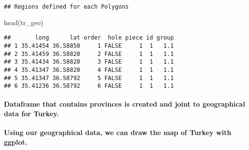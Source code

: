 \documentclass[
]{article}
\newenvironment{Shaded}{\begin{snugshade}}{\end{snugshade}}
\newcommand{\AttributeTok}[1]{\textcolor[rgb]{0.77,0.63,0.00}{#1}}
\newcommand{\CommentTok}[1]{\textcolor[rgb]{0.56,0.35,0.01}{\textit{#1}}}
\newcommand{\FunctionTok}[1]{\textcolor[rgb]{0.00,0.00,0.00}{#1}}
\newcommand{\NormalTok}[1]{#1}
\newcommand{\OtherTok}[1]{\textcolor[rgb]{0.56,0.35,0.01}{#1}}
\newcommand{\SpecialCharTok}[1]{\textcolor[rgb]{0.00,0.00,0.00}{#1}}
\newcommand{\StringTok}[1]{\textcolor[rgb]{0.31,0.60,0.02}{#1}}
\begin{document}
\begin{verbatim}
## Regions defined for each Polygons
\end{verbatim}

\begin{Shaded}
\begin{Highlighting}[]
\FunctionTok{head}\NormalTok{(tr\_geo)}
\end{Highlighting}
\end{Shaded}

\begin{verbatim}
##       long      lat order  hole piece id group
## 1 35.41454 36.58850     1 FALSE     1  1   1.1
## 2 35.41459 36.58820     2 FALSE     1  1   1.1
## 3 35.41434 36.58820     3 FALSE     1  1   1.1
## 4 35.41347 36.58820     4 FALSE     1  1   1.1
## 5 35.41347 36.58792     5 FALSE     1  1   1.1
## 6 35.41236 36.58792     6 FALSE     1  1   1.1
\end{verbatim}

\hypertarget{dataframe-that-contains-provinces-is-created-and-joint-to-geographical-data-for-turkey.}{%
\paragraph{Dataframe that contains provinces is created and joint to
geographical data for
Turkey.}\label{dataframe-that-contains-provinces-is-created-and-joint-to-geographical-data-for-turkey.}}

\begin{Shaded}
\end{Shaded}

\hypertarget{using-our-geographical-data-we-can-draw-the-map-of-turkey-with-ggplot.}{%
\paragraph{Using our geographical data, we can draw the map of Turkey
with
ggplot.}\label{using-our-geographical-data-we-can-draw-the-map-of-turkey-with-ggplot.}}
\end{document}
